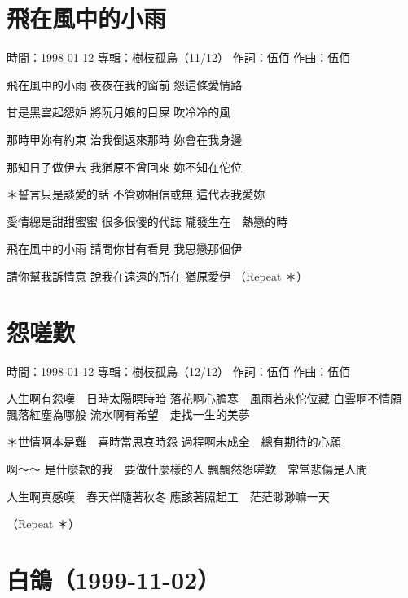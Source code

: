 \documentclass[UTF8,a4paper,oneside,twocolumn,12pt]{ctexbook}
\newcommand{\infopair}[2]{\textbullet #1：#2}
\newcommand{\zc}[1][伍佰]{\infopair{作詞}{#1}}
\newcommand{\zq}[1][伍佰]{\infopair{作曲}{#1}}
\newcommand{\zj}[1]{\infopair{專輯}{#1}}
\newcommand{\sj}[1]{\infopair{時間}{#1}}
\newenvironment{info}{\begin{flushleft}\kaishu
	}
	{\end{flushleft}\normalsize\yahei\par}
\newenvironment{lyric}{
	}
{}
\begin{document}
\section{飛在風中的小雨}
\begin{info}
	\sj{1998-01-12}
	\zj{樹枝孤鳥（11/12）}
	\zc
	\zq
\end{info}
\begin{lyric}
	飛在風中的小雨
	夜夜在我的窗前
	怨這條愛情路

	甘是黑雲起怨妒
	將阮月娘的目屎
	吹冷冷的風

	那時甲妳有約束
	治我倒返來那時
	妳會在我身邊

	那知日子做伊去
	我猶原不曾回來
	妳不知在佗位

	＊誓言只是談愛的話
	不管妳相信或無
	這代表我愛妳

	愛情總是甜甜蜜蜜
	很多很傻的代誌
	隴發生在　熱戀的時

	飛在風中的小雨
	請問你甘有看見
	我思戀那個伊

	請你幫我訴情意
	說我在遠遠的所在
	猶原愛伊
	（Repeat ＊）
\end{lyric}

\section{怨嗟歎}
\begin{info}
	\sj{1998-01-12}
	\zj{樹枝孤鳥（12/12）}
	\zc
	\zq
\end{info}
\begin{lyric}
	人生啊有怨嘆　日時太陽瞑時暗
	落花啊心膽寒　風雨若來佗位藏
	白雲啊不情願　飄落紅塵為哪般
	流水啊有希望　走找一生的美夢

	＊世情啊本是難　喜時當思哀時怨
	過程啊未成全　總有期待的心願

	啊～～
	是什麼款的我　要做什麼樣的人
	飄飄然怨嗟歎　常常悲傷是人間

	人生啊真感嘆　春天伴隨著秋冬
	應該著照起工　茫茫渺渺嘛一天

	（Repeat ＊）
\end{lyric}


\section*{白鴿（1999-11-02）}
\end{document}
